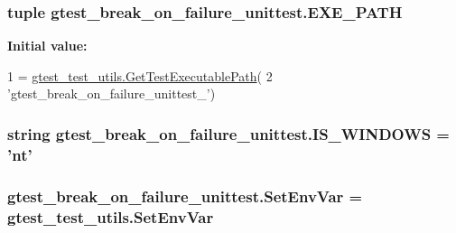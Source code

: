 \hypertarget{namespacegtest__break__on__failure__unittest_aa546748fb3f26cc797f240387333fc3a}{
\subsubsection[{E\-X\-E\-\_\-\-P\-A\-T\-H}]{\setlength{\rightskip}{0pt plus 5cm}tuple gtest\-\_\-break\-\_\-on\-\_\-failure\-\_\-unittest.\-E\-X\-E\-\_\-\-P\-A\-T\-H}}\label{namespacegtest__break__on__failure__unittest_aa546748fb3f26cc797f240387333fc3a}
{\bfseries Initial value\-:}
\begin{DoxyCode}
1 = \hyperlink{namespacegtest__test__utils_a1bdf3cac86afa675ed37629b183048e9}{gtest\_test\_utils.GetTestExecutablePath}(
2     \textcolor{stringliteral}{'gtest\_break\_on\_failure\_unittest\_'})
\end{DoxyCode}
\hypertarget{namespacegtest__break__on__failure__unittest_aec67fcd1a946db2d8c747f6519a5bb05}{
\subsubsection[{I\-S\-\_\-\-W\-I\-N\-D\-O\-W\-S}]{\setlength{\rightskip}{0pt plus 5cm}string gtest\-\_\-break\-\_\-on\-\_\-failure\-\_\-unittest.\-I\-S\-\_\-\-W\-I\-N\-D\-O\-W\-S = 'nt'}}\label{namespacegtest__break__on__failure__unittest_aec67fcd1a946db2d8c747f6519a5bb05}
\hypertarget{namespacegtest__break__on__failure__unittest_a6d10069714f75f3f755c1d2c9c0ddd15}{
\subsubsection[{Set\-Env\-Var}]{\setlength{\rightskip}{0pt plus 5cm}gtest\-\_\-break\-\_\-on\-\_\-failure\-\_\-unittest.\-Set\-Env\-Var = gtest\-\_\-test\-\_\-utils.\-Set\-Env\-Var}}\label{namespacegtest__break__on__failure__unittest_a6d10069714f75f3f755c1d2c9c0ddd15}
